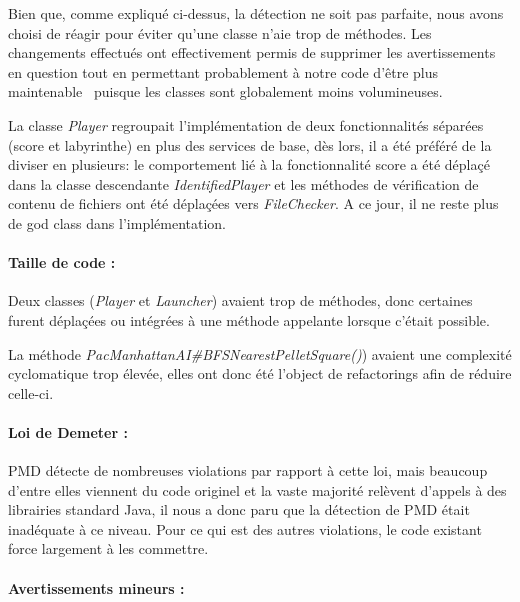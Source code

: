 \documentclass[12pt, openany]{report}
\begin{document}
Bien que, comme expliqué ci-dessus, la détection ne soit pas parfaite, nous avons choisi de réagir pour éviter qu'une classe n'aie trop de méthodes. Les changements effectués ont effectivement permis de supprimer les avertissements en question tout en permettant probablement à notre code d'être plus \og maintenable \fg \, puisque les classes sont globalement moins volumineuses.

La classe \mbox{\textit{Player}} regroupait l'implémentation de deux fonctionnalités séparées (score et labyrinthe) en plus des services de base, dès lors, il a été préféré de la diviser en plusieurs: le comportement lié à la fonctionnalité \og score \fg \space a été déplaçé dans la classe descendante \mbox{\textit{IdentifiedPlayer}} et les méthodes de vérification de contenu de fichiers ont été déplaçées vers \mbox{\textit{FileChecker}}.
A ce jour, il ne reste plus de \og god class \fg \space dans l'implémentation.


\paragraph{Taille de code : }

Deux classes (\mbox{\textit{Player}} et \mbox{\textit{Launcher}}) avaient trop de méthodes, donc certaines furent déplaçées ou intégrées à une méthode appelante lorsque c'était possible.

La méthode \mbox{\textit{PacManhattanAI\#BFSNearestPelletSquare()}}) avaient une complexité cyclomatique trop élevée, elles ont donc été l'object de \og refactorings \fg afin de réduire celle-ci.

\paragraph{Loi de Demeter : }

PMD détecte de nombreuses violations par rapport à cette loi, mais beaucoup d'entre elles viennent du code originel et la vaste majorité relèvent d'appels à des librairies standard Java, il nous a donc paru que la détection de PMD était inadéquate à ce niveau.
Pour ce qui est des autres violations, le code existant force largement à les commettre.

\paragraph{Avertissements mineurs : }
\end{document}
